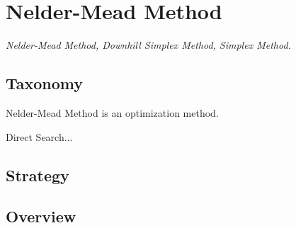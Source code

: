 
\section{Nelder-Mead Method} 
\label{sec:neldermead}

\emph{Nelder-Mead Method, Downhill Simplex Method, Simplex Method.}

\subsection{Taxonomy}
Nelder-Mead Method is an optimization method.

Direct Search...

\subsection{Strategy}


\subsection{Overview}

